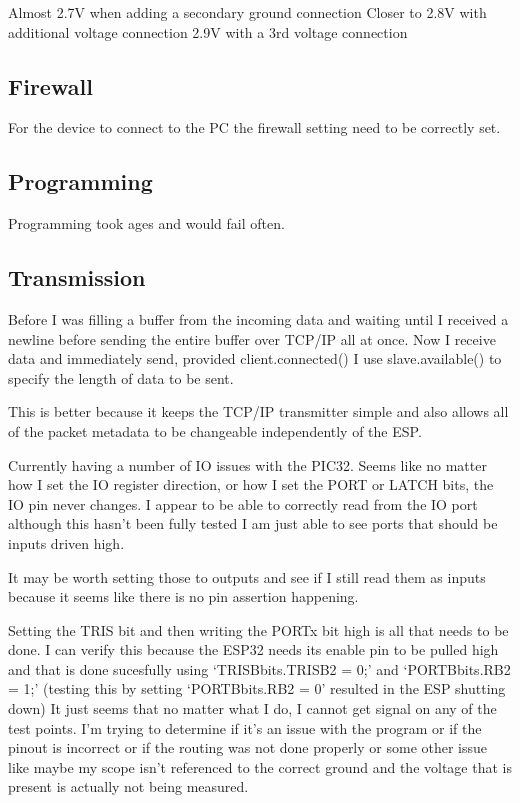 Almost 2.7V when adding a secondary ground connection
Closer to 2.8V with additional voltage connection
2.9V with a 3rd voltage connection

\subsection{Firewall}
For the device to connect to the PC the firewall setting need to be correctly set.

\subsection{Programming}
Programming took ages and would fail often.

\subsection{Transmission}
Before I was filling a buffer from the incoming data and waiting until I received
a newline before sending the entire buffer over TCP/IP all at once.
Now I receive data and immediately send, provided client.connected()
I use slave.available() to specify the length of data to be sent.

This is better because it keeps the TCP/IP transmitter simple and also allows all
of the packet metadata to be changeable independently of the ESP.

Currently having a number of IO issues with the PIC32.
Seems like no matter how I set the IO register direction, or how I set
the PORT or LATCH bits, the IO pin never changes.
I appear to be able to correctly read from the IO port although this
hasn't been fully tested I am just able to see ports that should be
inputs driven high.

It may be worth setting those to outputs and see if I still read them
as inputs because it seems like there is no pin assertion happening.

Setting the TRIS bit and then writing the PORTx bit high is all that
needs to be done.
I can verify this because the ESP32 needs its enable pin to be pulled
high and that is done sucesfully using `TRISBbits.TRISB2 = 0;' and
`PORTBbits.RB2 = 1;'
(testing this by setting `PORTBbits.RB2 = 0' resulted in the ESP
shutting down)
It just seems that no matter what I do, I cannot get signal on any of
the test points. I'm trying to determine if it's an issue with the
program or if the pinout is incorrect or if the routing was not done
properly or some other issue like maybe my scope isn't referenced to
the correct ground and the voltage that is present is actually not
being measured.

